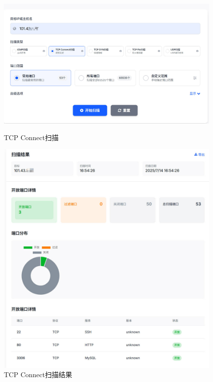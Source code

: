 \documentclass[12pt,hyperref,a4paper,UTF8]{ctexart}
\begin{document}
\begin{figure}[!htbp]
    \centering
    \begin{minipage}[t]{0.48\textwidth}
        \centering
        \includegraphics[width=\textwidth]{figures/connectScan.jpg}
        \caption{TCP Connect扫描}
        \label{fig:connectScan}
    \end{minipage}
    \hfill
    \begin{minipage}[t]{0.48\textwidth}
        \centering
        \includegraphics[width=\textwidth]{figures/connectRes.jpg}
        \caption{TCP Connect扫描结果}
        \label{fig:connectRes}
    \end{minipage}
\end{figure}
\end{document}
